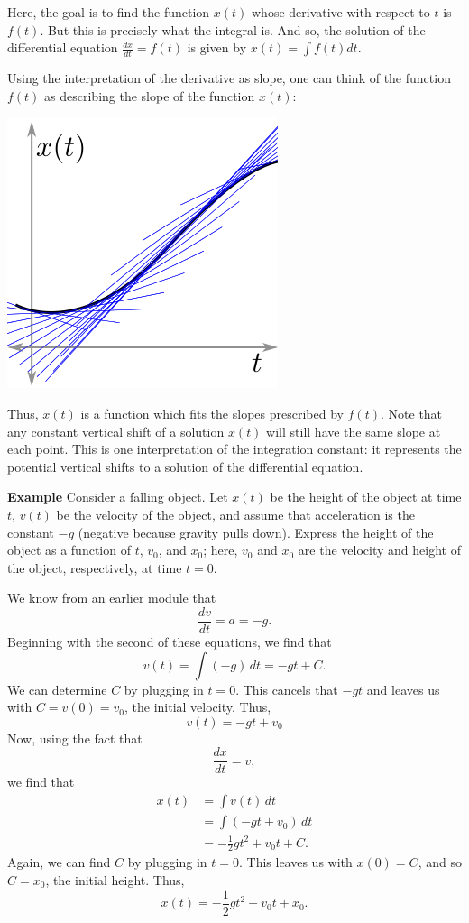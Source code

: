 \documentclass[twoside,openright,titlepage,a4paper]{book}
\begin{document}
\begin{sloppypar}
Here, the goal is to find the function $x(t)$ whose derivative with respect to $t$ is $f(t)$. But this is precisely what the integral is. And so, the solution of the differential equation $\frac{dx}{dt} = f(t)$ is given by $x(t) = \int f(t)dt$.

Using the interpretation of the derivative as slope, one can think of the function $f(t)$ as describing the slope of the function $x(t)$:
\begin{center}\includegraphics[scale=0.6]{ODESlope}\end{center}

Thus, $x(t)$ is a function which fits the slopes prescribed by $f(t)$. Note that any constant vertical shift of a solution $x(t)$ will still have the same slope at each point. This is one interpretation of the integration constant: it represents the potential vertical shifts to a solution of the differential equation.

\textbf{Example} Consider a falling object. Let $x(t)$ be the height of the object at time $t$, $v(t)$ be the velocity of the object, and assume that acceleration is the constant $-g$ (negative because gravity pulls down). Express the height of the object as a function of $t$, $v_0$, and $x_0$; here, $v_0$ and $x_0$ are the velocity and height of the object, respectively, at time $t=0$.
\begin{examplebox}
We know from an earlier module that \[ \frac{dv}{dt} = a = -g. \]
Beginning with the second of these equations, we find that \[ v(t) = \int (-g) \, dt = -gt + C. \]
We can determine $C$ by plugging in $t=0$. This cancels that $-gt$ and leaves us with $C = v(0) = v_0$, the initial velocity. Thus, \[ v(t) = -gt + v_0 \]
Now, using the fact that \[ \frac{dx}{dt} = v, \]
we find that
\begin{align*}
x(t) &= \int v(t) \, dt \\
&= \int (-gt + v_0) \, dt \\
&= -\frac{1}{2}gt^2 + v_0t + C.
\end{align*}
Again, we can find $C$ by plugging in $t=0$. This leaves us with $x(0) = C$, and so $C=x_0$, the initial height. Thus, \[ x(t) = -\frac{1}{2}gt^2 + v_0t + x_0. \]
\end{examplebox}	


\end{sloppypar}
\end{document}
